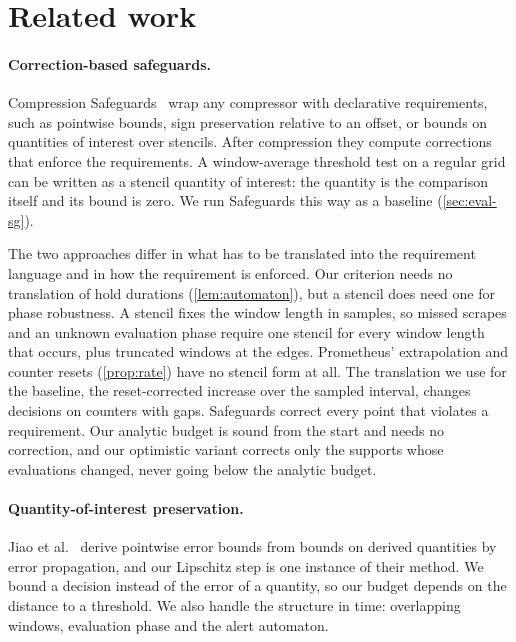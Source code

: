 \section{Related work}
\label{sec:related}

\paragraph{Correction-based safeguards.} Compression
Safeguards~\cite{tyree2026safeguards} wrap any compressor with declarative
requirements, such as pointwise bounds, sign preservation relative to an
offset, or bounds on quantities of interest over stencils. After
compression they compute corrections that enforce the requirements. A
window-average threshold test on a regular grid can be written as a stencil
quantity of interest: the quantity is the comparison itself and its bound
is zero. We run Safeguards this way as a baseline (\cref{sec:eval-sg}).

The two approaches differ in what has to be translated into the
requirement language and in how the requirement is enforced. Our
criterion needs no translation of hold durations (\cref{lem:automaton}),
but a stencil does need one for phase robustness. A stencil fixes the
window length in samples, so missed scrapes and an unknown evaluation
phase require one stencil for every window length that occurs, plus
truncated windows at the edges. Prometheus'  extrapolation and
counter resets (\cref{prop:rate}) have no stencil form at all. The
translation we use for the baseline, the reset-corrected increase over the
sampled interval, changes decisions on counters with gaps. Safeguards
correct every point that violates a requirement. Our analytic budget is
sound from the start and needs no correction, and our optimistic variant
corrects only the supports whose evaluations changed, never going below
the analytic budget.

\paragraph{Quantity-of-interest preservation.} Jiao et
al.~\cite{jiao2022qoi} derive pointwise error bounds from bounds on derived
quantities by error propagation, and our Lipschitz step is one instance of
their method. We bound a decision instead of the error of a quantity, so
our budget depends on the distance to a threshold. We also handle the
structure in time: overlapping windows, evaluation phase and the alert
automaton.

